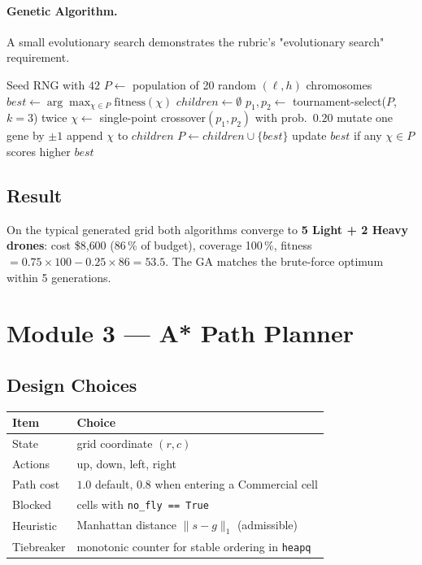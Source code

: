 \documentclass[11pt,a4paper]{article}
\begin{document}
\paragraph{Genetic Algorithm.} A small evolutionary search demonstrates
the rubric's "evolutionary search" requirement.

\begin{algorithm}[H]
\caption{\textsc{FleetGA}(grid, budget, generations $=30$, population $=20$)}
\label{alg:ga}
\begin{algorithmic}[1]
\State Seed RNG with $42$
\State $P \gets$ population of 20 random $(\ell, h)$ chromosomes
\State $best \gets \arg\max_{\chi \in P} \text{fitness}(\chi)$
  \State $children \gets \emptyset$
    \State $p_1, p_2 \gets$ tournament-select($P$, $k=3$) twice
    \State $\chi \gets$ single-point crossover$(p_1, p_2)$
    \State with prob.\ $0.20$ mutate one gene by $\pm 1$
    \State append $\chi$ to $children$
  \EndWhile
  \State $P \gets children \cup \{best\}$ 
  \State update $best$ if any $\chi \in P$ scores higher
\EndFor
\State \Return $best$
\end{algorithmic}
\end{algorithm}

\subsection{Result}
On the typical generated grid both algorithms converge to
\textbf{5 Light + 2 Heavy drones}: cost \$8{,}600 (86\,\% of budget),
coverage 100\,\%, fitness $= 0.75 \times 100 - 0.25 \times 86 = 53.5$.
The GA matches the brute-force optimum within 5 generations.

\section{Module 3 --- A* Path Planner}
\label{sec:astar}

\subsection{Design Choices}
\begin{table}[H]
\centering
\begin{tabular}{@{}ll@{}}
\toprule
\textbf{Item} & \textbf{Choice} \\
\midrule
State          & grid coordinate $(r,c)$ \\
Actions        & up, down, left, right \\
Path cost      & $1.0$ default, $0.8$ when entering a Commercial cell \\
Blocked        & cells with \texttt{no\_fly == True} \\
Heuristic      & Manhattan distance $\|s - g\|_1$ (admissible) \\
Tiebreaker     & monotonic counter for stable ordering in \texttt{heapq} \\
\bottomrule
\end{tabular}
\end{table}
\end{document}
